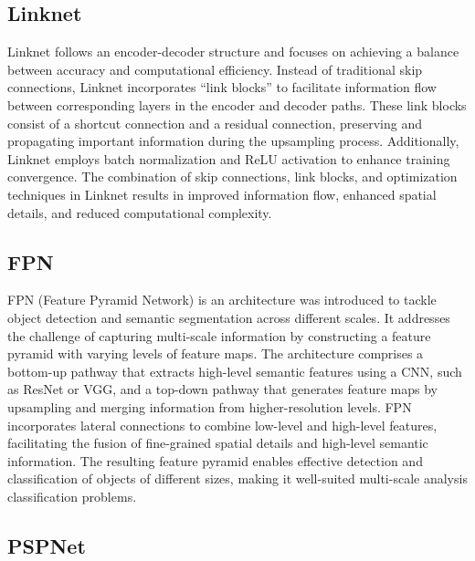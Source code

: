 \subsection{Linknet}

Linknet \cite{Chaurasia2017} follows an encoder-decoder structure and
focuses on achieving a balance between accuracy and computational efficiency.
Instead of traditional skip connections, Linknet incorporates ``link blocks''
to facilitate information flow between corresponding layers in the encoder and
decoder paths. These link blocks consist of a shortcut connection and a
residual connection, preserving and propagating important information during
the upsampling process. Additionally, Linknet employs batch normalization and
ReLU activation to enhance training convergence. The combination of skip
connections, link blocks, and optimization techniques in Linknet results in
improved information flow, enhanced spatial details, and reduced computational
complexity.

\subsection{FPN}

FPN (Feature Pyramid Network) \cite{Lin2017} is an architecture was
introduced to tackle object detection and semantic segmentation across
different scales. It addresses the challenge of capturing multi-scale
information by constructing a feature pyramid with varying levels of feature
maps. The architecture comprises a bottom-up pathway that extracts high-level
semantic features using a CNN, such as ResNet or VGG, and a top-down pathway
that generates feature maps by upsampling and merging information from
higher-resolution levels. FPN incorporates lateral connections to combine
low-level and high-level features, facilitating the fusion of fine-grained
spatial details and high-level semantic information. The resulting feature
pyramid enables effective detection and classification of objects of different
sizes, making it well-suited multi-scale analysis classification problems.

\subsection{PSPNet}

